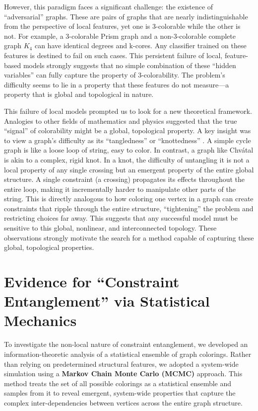 \documentclass[12pt, letterpaper]{article}
\begin{document}
However, this paradigm faces a significant challenge: the existence of ``adversarial'' graphs. These are pairs of graphs that are nearly indistinguishable from the perspective of local features, yet one is 3-colorable while the other is not. For example, a 3-colorable Prism graph and a non-3-colorable complete graph $K_4$ can have identical degrees and k-cores. Any classifier trained on these features is destined to fail on such cases. This persistent failure of local, feature-based models strongly suggests that no simple combination of these ``hidden variables'' can fully capture the property of 3-colorability. The problem's difficulty seems to lie in a property that these features do not measure—a property that is global and topological in nature.

This failure of local models prompted us to look for a new theoretical framework. Analogies to other fields of mathematics and physics suggested that the true ``signal'' of colorability might be a global, topological property. A key insight was to view a graph's difficulty as its ``tangledness'' or ``knottedness'' \cite{welsh1993complexity, hardy1918asymptotic}. A simple cycle graph is like a loose loop of string, easy to color. In contrast, a graph like Chvátal is akin to a complex, rigid knot. In a knot, the difficulty of untangling it is not a local property of any single crossing but an emergent property of the entire global structure. A single constraint (a crossing) propagates its effects throughout the entire loop, making it incrementally harder to manipulate other parts of the string. This is directly analogous to how coloring one vertex in a graph can create constraints that ripple through the entire structure, ``tightening'' the problem and restricting choices far away. This suggests that any successful model must be sensitive to this global, nonlinear, and interconnected topology. These observations strongly motivate the search for a method capable of capturing these global, topological properties.

\section{Evidence for ``Constraint Entanglement'' via Statistical Mechanics}

To investigate the non-local nature of constraint entanglement, we developed an information-theoretic analysis of a statistical ensemble of graph colorings. Rather than relying on predetermined structural features, we adopted a system-wide simulation using a \textbf{Markov Chain Monte Carlo (MCMC)} approach. This method treats the set of all possible colorings as a statistical ensemble and samples from it to reveal emergent, system-wide properties that capture the complex inter-dependencies between vertices across the entire graph structure.
\end{document}
